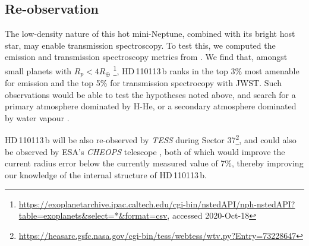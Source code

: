 \documentclass[fleqn,usenatbib]{mnras}
\newcommand{\tess}{{\it TESS}}
\newcommand{\Tplanet}{HD\,110113\,b}
\begin{document}
\subsection{Re-observation}\label{sect:future}
The low-density nature of this hot mini-Neptune, combined with its bright host star, may enable transmission spectroscopy.
To test this, we computed the emission and transmission spectroscopy metrics from \citet{kempton2018framework}. 
We find that, amongst small planets with $R_p<4R_\oplus$ \citep{akeson2013nasa}\footnote{\url{https://exoplanetarchive.ipac.caltech.edu/cgi-bin/nstedAPI/nph-nstedAPI?table=exoplanets&select=*&format=csv}, accessed 2020-Oct-18}, \Tplanet{} ranks in the top 3\% most amenable for emission and the top 5\% for transmission spectrocopy with JWST.
Such observations would be able to test the hypotheses noted above, and search for a primary atmosphere dominated by H-He, or a secondary atmosphere dominated by water vapour \citep{2020arXiv201011867B}.

\Tplanet{} will be also re-observed by \tess{} during Sector 37\footnote{\url{https://heasarc.gsfc.nasa.gov/cgi-bin/tess/webtess/wtv.py?Entry=73228647}}, and could also be observed by ESA's \textit{CHEOPS} telescope \citep{benz2020cheops}, both of which would improve the current radius error below the currently measured value of 7\%, thereby improving our knowledge of the internal structure of \Tplanet{}.
\end{document}
